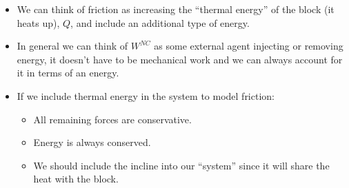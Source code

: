 \documentclass[aspectratio=169,
hyperref={colorlinks,urlcolor=blue}
]{beamer}
\begin{document}
{

\begin{itemize}
\item We can think of friction as increasing the ``thermal energy'' of the block (it heats up), $Q$, and include an additional type of energy.
\item In general we can think of $W^{NC}$ as some external agent injecting or removing energy, it doesn't have to be mechanical work and we can always account for it in terms of an energy.
\item If we include thermal energy in the system to model friction:
\begin{itemize}
\item All remaining forces are conservative.
\item Energy is always conserved.
\item We should include the incline into our ``system'' since it will share the heat with the block.
\end{itemize}
\end{itemize}

}
\end{document}
